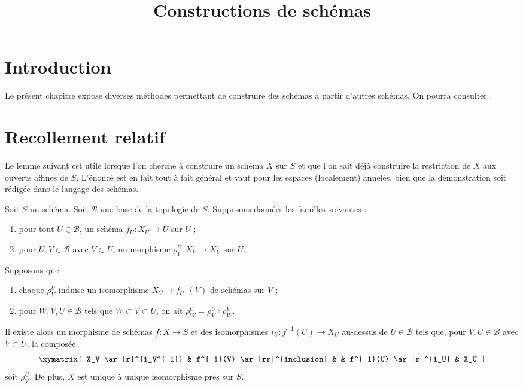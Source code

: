 

%


\title{Constructions de schémas}


\maketitle

\label{section-phantom}

\tableofcontents

\section{Introduction}
\label{section-introduction}

\noindent
Le présent chapitre expose diverses méthodes permettant de construire des
schémas à partir d'autres schémas. On pourra consulter \cite{EGA}.





\section{Recollement relatif}
\label{section-relative-glueing}

\noindent
Le lemme suivant est utile lorsque l'on cherche à construire un schéma $X$
sur $S$ et que l'on sait déjà construire la restriction de $X$ aux ouverts affines
de $S$. L'énoncé est en fait tout à fait général et vaut pour les espaces
(localement) annelés, bien que la démonstration soit rédigée dans le langage
des schémas.

\begin{lemma}
\label{lemma-relative-glueing}
Soit $S$ un schéma. Soit $\mathcal{B}$ une base de la topologie de $S$.
Supposons données les familles suivantes :
\begin{enumerate}
\item pour tout $U \in \mathcal{B}$, un schéma $f_U : X_U \to U$ sur $U$ ;
\item pour $U, V \in \mathcal{B}$ avec $V \subset U$, un morphisme
$\rho^U_V : X_V \to X_U$ sur $U$.
\end{enumerate}
Supposons que
\begin{enumerate}
\item[(a)] chaque $\rho^U_V$ induise un isomorphisme
$X_V \to f_U^{-1}(V)$ de schémas sur $V$ ;
\item[(b)] pour $W, V, U \in \mathcal{B}$ tels que
$W \subset V \subset U$, on ait $\rho^U_W = \rho^U_V \circ \rho ^V_W$.
\end{enumerate}
Il existe alors un morphisme de schémas
$f : X \to S$ et des isomorphismes
$i_U : f^{-1}(U) \to X_U$ au-dessus de $U \in \mathcal{B}$ tels que,
pour $V, U \in \mathcal{B}$ avec $V \subset U$, la composée
$$
\xymatrix{
X_V \ar[r]^{i_V^{-1}} &
f^{-1}(V) \ar[rr]^{inclusion} & &
f^{-1}(U) \ar[r]^{i_U} &
X_U
}
$$
soit $\rho^U_V$. De plus, $X$ est unique
à unique isomorphisme près sur $S$.
\end{lemma}


